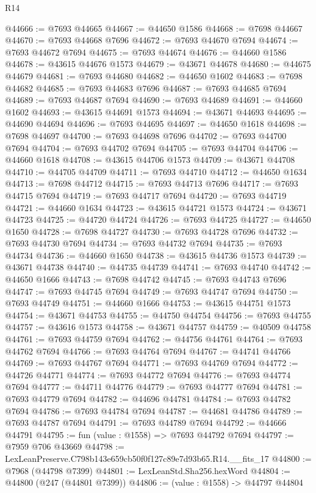 \begin{lexlean}{R14}
\begin{coremodule}
@44666 := @7693 @44665
@44667 := @44650 @1586
@44668 := @7698 @44667
@44670 := @7693 @44668 @7696
@44672 := @7693 @44670 @7694
@44674 := @7693 @44672 @7694
@44675 := @7693 @44674
@44676 := @44660 @1586
@44678 := @43615 @44676 @1573
@44679 := @43671 @44678
@44680 := @44675 @44679
@44681 := @7693 @44680
@44682 := @44650 @1602
@44683 := @7698 @44682
@44685 := @7693 @44683 @7696
@44687 := @7693 @44685 @7694
@44689 := @7693 @44687 @7694
@44690 := @7693 @44689
@44691 := @44660 @1602
@44693 := @43615 @44691 @1573
@44694 := @43671 @44693
@44695 := @44690 @44694
@44696 := @7693 @44695
@44697 := @44650 @1618
@44698 := @7698 @44697
@44700 := @7693 @44698 @7696
@44702 := @7693 @44700 @7694
@44704 := @7693 @44702 @7694
@44705 := @7693 @44704
@44706 := @44660 @1618
@44708 := @43615 @44706 @1573
@44709 := @43671 @44708
@44710 := @44705 @44709
@44711 := @7693 @44710
@44712 := @44650 @1634
@44713 := @7698 @44712
@44715 := @7693 @44713 @7696
@44717 := @7693 @44715 @7694
@44719 := @7693 @44717 @7694
@44720 := @7693 @44719
@44721 := @44660 @1634
@44723 := @43615 @44721 @1573
@44724 := @43671 @44723
@44725 := @44720 @44724
@44726 := @7693 @44725
@44727 := @44650 @1650
@44728 := @7698 @44727
@44730 := @7693 @44728 @7696
@44732 := @7693 @44730 @7694
@44734 := @7693 @44732 @7694
@44735 := @7693 @44734
@44736 := @44660 @1650
@44738 := @43615 @44736 @1573
@44739 := @43671 @44738
@44740 := @44735 @44739
@44741 := @7693 @44740
@44742 := @44650 @1666
@44743 := @7698 @44742
@44745 := @7693 @44743 @7696
@44747 := @7693 @44745 @7694
@44749 := @7693 @44747 @7694
@44750 := @7693 @44749
@44751 := @44660 @1666
@44753 := @43615 @44751 @1573
@44754 := @43671 @44753
@44755 := @44750 @44754
@44756 := @7693 @44755
@44757 := @43616 @1573
@44758 := @43671 @44757
@44759 := @40509 @44758
@44761 := @7693 @44759 @7694
@44762 := @44756 @44761
@44764 := @7693 @44762 @7694
@44766 := @7693 @44764 @7694
@44767 := @44741 @44766
@44769 := @7693 @44767 @7694
@44771 := @7693 @44769 @7694
@44772 := @44726 @44771
@44774 := @7693 @44772 @7694
@44776 := @7693 @44774 @7694
@44777 := @44711 @44776
@44779 := @7693 @44777 @7694
@44781 := @7693 @44779 @7694
@44782 := @44696 @44781
@44784 := @7693 @44782 @7694
@44786 := @7693 @44784 @7694
@44787 := @44681 @44786
@44789 := @7693 @44787 @7694
@44791 := @7693 @44789 @7694
@44792 := @44666 @44791
@44795 := fun (value : @1558) => @7693 @44792 @7694
@44797 := @7959 @706 @43669
@44798 := LexLeanPreserve.C798b143e659cb50f0f127c89e7d93b65.R14.__fits_17
@44800 := @7968 (@44798 @7399)
@44801 := LexLeanStd.Sha256.hexWord
@44804 := @44800 (@247 (@44801 @7399))
@44806 := (value : @1558) -> @44797 @44804

\end{coremodule}
\end{lexlean}
